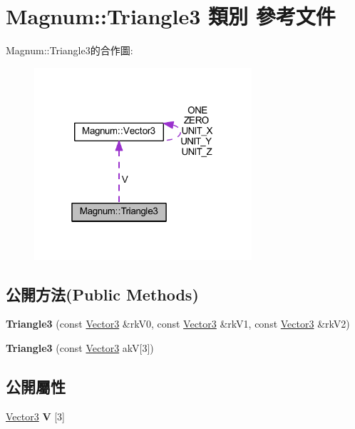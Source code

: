 \hypertarget{class_magnum_1_1_triangle3}{}\section{Magnum\+:\+:Triangle3 類別 參考文件}
\label{class_magnum_1_1_triangle3}


Magnum\+:\+:Triangle3的合作圖\+:\nopagebreak
\begin{figure}[H]
\begin{center}
\leavevmode
\includegraphics[width=229pt]{class_magnum_1_1_triangle3__coll__graph}
\end{center}
\end{figure}
\subsection*{公開方法(Public Methods)}
\begin{DoxyCompactItemize}
\item 
{\bfseries Triangle3} (const \hyperlink{class_magnum_1_1_vector3}{Vector3} \&rk\+V0, const \hyperlink{class_magnum_1_1_vector3}{Vector3} \&rk\+V1, const \hyperlink{class_magnum_1_1_vector3}{Vector3} \&rk\+V2)\hypertarget{class_magnum_1_1_triangle3_a30e493be9581f16b3c88aa57d726edfb}{}\label{class_magnum_1_1_triangle3_a30e493be9581f16b3c88aa57d726edfb}

\item 
{\bfseries Triangle3} (const \hyperlink{class_magnum_1_1_vector3}{Vector3} akV\mbox{[}3\mbox{]})\hypertarget{class_magnum_1_1_triangle3_aa1bcd284156522edd46365f0ea2e1089}{}\label{class_magnum_1_1_triangle3_aa1bcd284156522edd46365f0ea2e1089}

\end{DoxyCompactItemize}
\subsection*{公開屬性}
\begin{DoxyCompactItemize}
\item 
\hyperlink{class_magnum_1_1_vector3}{Vector3} {\bfseries V} \mbox{[}3\mbox{]}\hypertarget{class_magnum_1_1_triangle3_a26bb0e1f50db9f62b15b07b94b2c15e4}{}\label{class_magnum_1_1_triangle3_a26bb0e1f50db9f62b15b07b94b2c15e4}

\end{DoxyCompactItemize}


